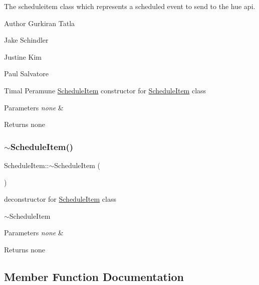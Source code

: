 The scheduleitem class which represents a scheduled event to send to the hue api. 

\begin{DoxyAuthor}{Author}
Gurkiran Tatla 

Jake Schindler 

Justine Kim 

Paul Salvatore 

Timal Peramune \hyperlink{class_schedule_item}{Schedule\+Item} constructor for \hyperlink{class_schedule_item}{Schedule\+Item} class
\end{DoxyAuthor}

\begin{DoxyParams}{Parameters}
{\em none} & \\
\hline
\end{DoxyParams}
\begin{DoxyReturn}{Returns}
none 
\end{DoxyReturn}
\mbox{\label{class_schedule_item_a1b3f5ec201516ee539349966bfa4c342}} 
\subsubsection{\texorpdfstring{$\sim$\+Schedule\+Item()}{~ScheduleItem()}}
{\footnotesize\ttfamily Schedule\+Item\+::$\sim$\+Schedule\+Item (\begin{DoxyParamCaption}{ }\end{DoxyParamCaption})\hspace{0.3cm}{\ttfamily [virtual]}}



deconstructor for \hyperlink{class_schedule_item}{Schedule\+Item} class 

$\sim$\+Schedule\+Item 
\begin{DoxyParams}{Parameters}
{\em none} & \\
\hline
\end{DoxyParams}
\begin{DoxyReturn}{Returns}
none 
\end{DoxyReturn}


\subsection{Member Function Documentation}
\mbox{\label{class_schedule_item_a87e1755a000149294aec8ef4b4a950d1}} 
